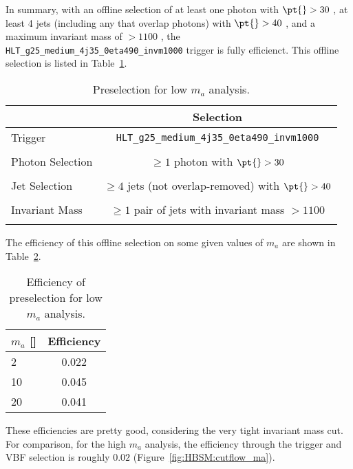 In summary, with an offline selection of at least one photon with $\pt{}>30$ \GeV{}, at least 4 jets (including any that overlap photons) with $\pt{}>40$ \GeV{}, and a maximum invariant mass of $>1100$ \GeV{}, the \texttt{HLT\_g25\_medium\_4j35\_0eta490\_invm1000} trigger is fully efficienct.
This offline selection is listed in Table~\ref{tab:HBSM_app:new_preselection}.
\begin{table}[htbp]
  \begin{center}
  \caption{Preselection for low $m_a$ analysis.}
  \label{tab:HBSM_app:new_preselection}
    {\footnotesize
  \begin{tabular}{ l c }
    \toprule
    & Selection \\
    \midrule
    Trigger & \texttt{HLT\_g25\_medium\_4j35\_0eta490\_invm1000} \\
    \\
    Photon Selection  & $\geq1$ photon with $\pt{}>30$ \GeV{} \\
    \\ 
    Jet Selection  & $\geq4$ jets (not overlap-removed) with $\pt{}>40$ \GeV{} \\
    \\ 
    Invariant Mass  & $\geq1$ pair of jets with invariant mass $>1100$ \GeV{} \\
    \\ 
    \bottomrule
  \end{tabular}
    }
  \end{center}
\end{table}

The efficiency of this offline selection on some given values of $m_a$ are shown in Table~\ref{tab:HBSM_app:new_preselection_eff}.
\begin{table}[htbp]
  \begin{center}
  \caption{Efficiency of preselection for low $m_a$ analysis.}
  \label{tab:HBSM_app:new_preselection_eff}
    {\footnotesize
  \begin{tabular}{ l c }
    \toprule
    $m_a$ [\GeV{}] & Efficiency \\
    \midrule
    2 & 0.022 \\
    10 & 0.045 \\
    20 & 0.041 \\
    \bottomrule
  \end{tabular}
    }
  \end{center}
\end{table}
These efficiencies are pretty good, considering the very tight invariant mass cut.
For comparison, for the high $m_a$ analysis, the efficiency through the trigger and VBF selection is roughly $0.02$ (Figure~\ref{fig:HBSM:cutflow_ma}).

